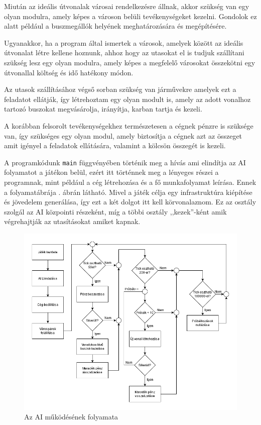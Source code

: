 Miután az ideális útvonalak városai rendelkezésre állnak, akkor szükség van egy olyan modulra, amely képes a városon belüli tevékenységeket kezelni. Gondolok ez alatt például a buszmegállók helyének meghatározására és megépítésére.

Ugyanakkor, ha a program által ismertek a városok, amelyek között az ideális útvonalat létre kellene hoznunk, ahhoz hogy az utasokat el is tudjuk szállítani szükség lesz egy olyan modulra, amely képes a megfelelő városokat összekötni egy útvonallal költség és idő hatékony módon.

Az utasok szállításához végső sorban szükség van járművekre amelyek ezt a feladatot ellátják, így létrehoztam egy olyan modult is, amely az adott vonalhoz tartozó buszokat megvásárolja, irányítja, karban tartja és kezeli.

A korábban felsorolt tevékenységekhez természetesen a cégnek pénzre is szüksége van, így szükséges egy olyan modul, amely biztosítja a cégnek azt az összeget amit igényel a feladatok ellátására, valamint a kölcsön összegét is kezeli.


A programkódunk \texttt{main} függvényében történik meg a hívás ami elindítja az AI folyamatot a játékon belül, ezért itt történnek meg a lényeges részei a programnak, mint például a cég létrehozása és a fő munkafolyamat leírása. Ennek a folyamatábrája . ábrán látható. Mivel a játék célja egy infrastruktúra kiépítése és jövedelem generálása, így ezt a két dolgot itt kell körvonalaznom. Ez az osztály szolgál az AI közpointi részeként, míg a többi osztály ,,kezek''-ként amik végrehajtják az utasításokat amiket kapnak.

\begin{figure}
	\centering
	\includegraphics[width=\textwidth]{images/folyamat.png}
	\caption{Az AI működésének folyamata}
	\label{fig:folyamat}
\end{figure}

